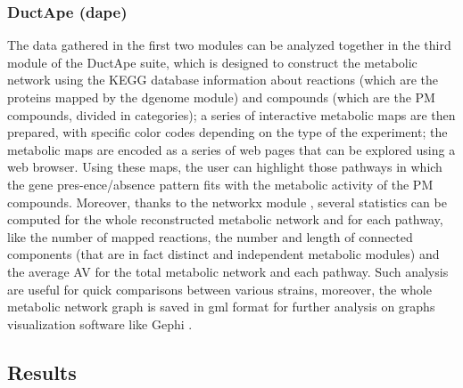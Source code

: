 \subsubsection{DuctApe (dape)} 
The data gathered in the first two modules can be analyzed together in the third module of the DuctApe suite, which is designed to construct the metabolic network using the KEGG database information about reactions (which are the proteins mapped by the dgenome module) and compounds (which are the PM compounds, divided in categories); a series of interactive metabolic maps are then prepared, with specific color codes depending on the type of the experiment; the metabolic maps are encoded as a series of web pages that can be explored using a web browser. Using these maps, the user can highlight those pathways in which the gene pres-ence/absence pattern fits with the metabolic activity of the PM compounds. Moreover, thanks to the networkx module \cite{hagberg2008exploring}, several statistics can be computed for the whole reconstructed metabolic network and for each pathway, like the number of mapped reactions, the number and length of connected components (that are in fact distinct and independent metabolic modules) and the average AV for the total metabolic network and each pathway. Such analysis are useful for quick comparisons between various strains, moreover, the whole metabolic network graph is saved in gml format for further analysis on graphs visualization software like Gephi \cite{bastian2009gephi}.

\subsection{Results}
